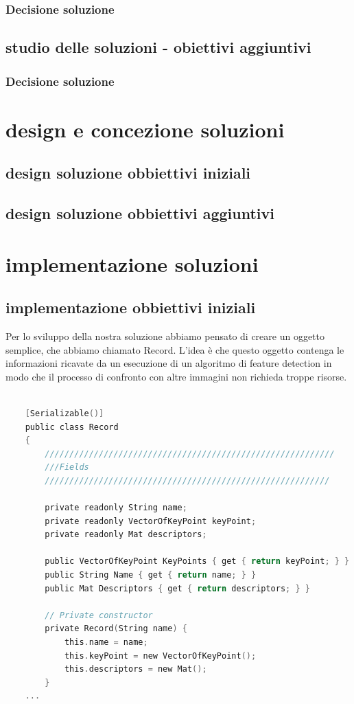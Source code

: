 \documentclass[twoside]{supsistudent}
\begin{document}
\subsection{Decisione soluzione}
\section{studio delle soluzioni - obiettivi aggiuntivi}
\subsection{Decisione soluzione }

\chapter{design e concezione soluzioni}
\section{design soluzione obbiettivi iniziali}
\section{design soluzione obbiettivi aggiuntivi}

\chapter{implementazione soluzioni}%
\section{implementazione obbiettivi iniziali}%
Per lo sviluppo della nostra soluzione abbiamo pensato di creare un oggetto semplice, che abbiamo chiamato Record. L'idea è che questo oggetto contenga le informazioni ricavate da un esecuzione di un algoritmo di feature detection in modo che il processo di confronto con altre immagini non richieda troppe risorse. 

\begin{lstlisting}[language=C]

    [Serializable()]
    public class Record
    {
        ///////////////////////////////////////////////////////////
        ///Fields
        //////////////////////////////////////////////////////////

        private readonly String name;
        private readonly VectorOfKeyPoint keyPoint;
        private readonly Mat descriptors;

        public VectorOfKeyPoint KeyPoints { get { return keyPoint; } }
        public String Name { get { return name; } }
        public Mat Descriptors { get { return descriptors; } }

        // Private constructor
        private Record(String name) {
            this.name = name;
            this.keyPoint = new VectorOfKeyPoint();
            this.descriptors = new Mat();
        }
    ...
\end{lstlisting}
\end{document}

